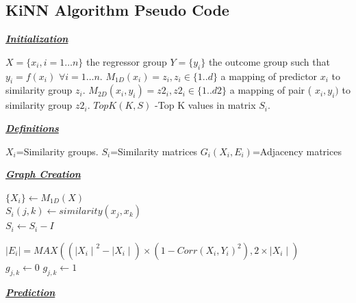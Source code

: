 \documentclass[a4paper]{article}
\begin{document}
\subsection{KiNN Algorithm Pseudo Code}
\underline{\textbf{\emph{Initialization}}}
\begin{algorithmic}
\small
\State$X=\{x_i, i=1\dots n \}$ the regressor group
\State $ Y=\{y_i\} $ the outcome group such that  $y_i = f(x_i)$ $\forall  i=1\dots n $.
\State $M_{1D}(x_i)=z_i, z_i \in \{1..d\}$ a mapping of predictor $x_i$ to similarity group $z_i$.
\State $M_{2D}(x_i,y_i)=z2_i, z2_i \in \{1..d2\}$ a mapping of pair ( $x_i,y_i)$ to similarity group $z2_i$.
\State $TopK(K,S)$ -Top K values in matrix $S_i$.
\end{algorithmic}
\underline{\textbf{\emph{Definitions}}}
\begin{algorithmic}
\small
\State $X_i$=Similarity groups.
\State $S_i$=Similarity matrices
\State $G_i(X_i,E_i)$=Adjacency  matrices
\end{algorithmic}
\underline{\textbf{\emph{Graph Creation}}}
\begin{algorithmic}
\small
\State $\{ X_i\}\leftarrow M_{1D}(X)$ \\
 
\State $S_i(j,k)\leftarrow similarity(x_j,x_k)$
\EndFor
\EndFor\\
  
\State $S_i\leftarrow S_i- I$
\EndFor
\\
 

\State $\mid E_i \mid= MAX(({\mid X_i \mid}^{2}-\mid X_i \mid ) \times (1 -Corr(X_i,Y_i)^2),2\times \mid X_i \mid)$
\EndFor
\\
 
\State $g_{j,k} \leftarrow 0$
\Else
\State $g_{j,k} \leftarrow 1$
\EndIf
\EndFor
\EndFor
\end{algorithmic}
\underline{\textbf{\emph{Prediction}}}
\end{document}
